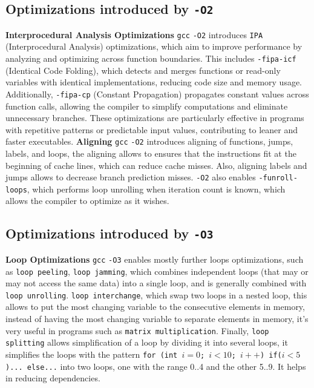 \documentclass{rapport}
\newcommand{\gcc}{\texttt{gcc} }
\newcommand{\optitwo}{\texttt{-O2} }
\newcommand{\optithree}{\texttt{-O3} }
\begin{document}
\subsection*{Optimizations introduced by \optitwo}
\textbf{Interprocedural Analysis Optimizations} \newline
\gcc \optitwo introduces \texttt{IPA} (Interprocedural Analysis) optimizations, which aim to improve performance by analyzing and optimizing across function boundaries. 
This includes \texttt{-fipa-icf} (Identical Code Folding), which detects and merges functions or read-only variables with identical implementations, reducing code size and memory usage. 
\newline
Additionally, \texttt{-fipa-cp} (Constant Propagation) propagates constant values across function calls, allowing the compiler to simplify computations and eliminate unnecessary branches. 
These optimizations are particularly effective in programs with repetitive patterns or predictable input values, contributing to leaner and faster executables.
\newline
\newline
\textbf{Aligning}\newline
\gcc \optitwo introduces aligning of functions, jumps, labels, and loops, the aligning allows to ensures that the instructions fit at the beginning of cache lines, which can reduce 
cache misses. Also, aligning labels and jumps allows to decrease branch prediction misses.
\newline\newline
\optitwo also enables \texttt{-funroll-loops}, which performs loop unrolling when iteration count is known, which allows the compiler to optimize as it wishes.

\subsection*{Optimizations introduced by \optithree}
\textbf{Loop Optimizations} \newline
\gcc \optithree enables mostly further loops optimizations, such as \texttt{loop peeling}, \texttt{loop jamming}, which combines independent loops (that may or may not access the 
same data) into a single loop, and is generally combined with \texttt{loop unrolling}.\newline
\texttt{loop interchange}, which swap two loops in a nested loop, this allows to put the most changing variable to the consecutive elements in memory, instead of having the most 
changing variable to separate elements in memory, it's very useful in programs such as \texttt{matrix multiplication}. 
\newline
Finally, \texttt{loop splitting} allows simplification of a loop 
by dividing it into several loops, it simplifies the loops with the pattern \texttt{for (int $i=0$; $i<10$; $i++$) if($i<5$)... else...} into two loops, one with the range 0..4 and 
the other 5..9. It helps in reducing dependencies.
\end{document}
